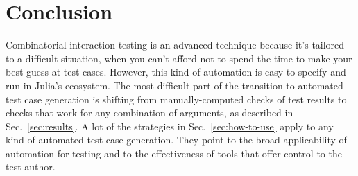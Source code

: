 \documentclass{juliacon}
\begin{document}
\section{Conclusion}
Combinatorial interaction testing is an advanced technique because it's tailored to a difficult situation, when you can't afford not to spend the time to make your best guess at test cases. However, this kind of automation is easy to specify and run in Julia's ecosystem. The most difficult part of the transition to automated test case generation is shifting from manually-computed checks of test results to checks that work for any combination of arguments, as described in Sec.~\ref{sec:results}. A lot of the strategies in Sec.~\ref{sec:how-to-use} apply to any kind of automated test case generation. They point to the broad applicability of automation for testing and to the effectiveness of tools that offer control to the test author.


\end{document}
